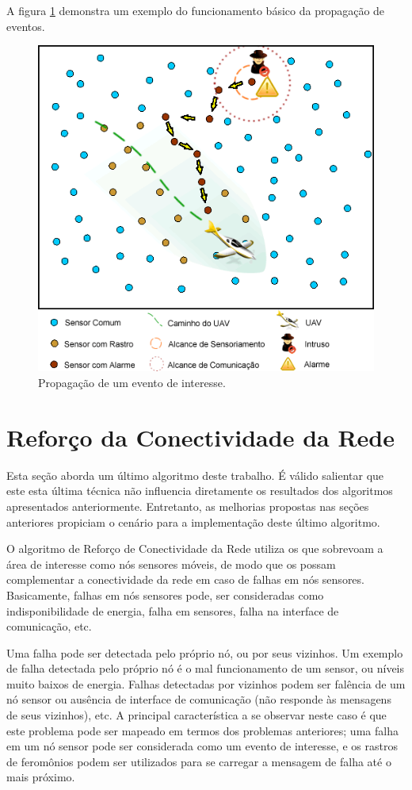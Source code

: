  A figura \ref{fig:app} demonstra um exemplo do funcionamento básico da propagação de eventos.
 
 \begin{figure}[h!]
 \centering
 \includegraphics[width=12cm]{pictures/application.png}
 \caption{Propagação de um evento de interesse.}
  \label{fig:app}
 \end{figure}



\section{Reforço da Conectividade da Rede}
Esta seção aborda um último algoritmo deste trabalho. É válido salientar que este esta última técnica não influencia diretamente os resultados dos algoritmos apresentados anteriormente. Entretanto, as melhorias propostas nas seções anteriores propiciam o cenário para a implementação deste último algoritmo.

O algoritmo de Reforço de Conectividade da Rede utiliza os \vants que sobrevoam a área de interesse como nós sensores móveis, de modo que os \vants possam complementar a conectividade da rede em caso de falhas em nós sensores. Basicamente, falhas em nós sensores pode, ser consideradas como indisponibilidade de energia, falha em sensores, falha na interface de comunicação, etc.

Uma falha pode ser detectada pelo próprio nó, ou por seus vizinhos. Um exemplo de falha detectada pelo próprio nó é o mal funcionamento de um sensor, ou níveis muito baixos de energia. Falhas detectadas por vizinhos podem ser falência de um nó sensor ou ausência de interface de comunicação (não responde às mensagens de seus vizinhos), etc. A principal característica a se observar neste caso é que este problema pode ser mapeado em termos dos problemas anteriores; uma falha em um nó sensor pode ser considerada como um evento de interesse, e os rastros de feromônios podem ser utilizados para se carregar a mensagem de falha até o \vant mais próximo.

